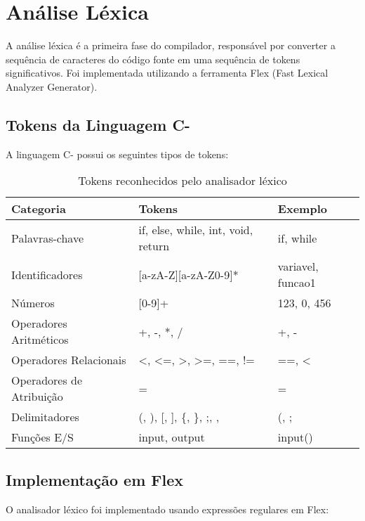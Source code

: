 \documentclass[
	12pt,				%
	oneside,
	a4paper,			%
	english,			%
	french,				%
	spanish,			%
	brazil,				%
	]{abntex2}
\begin{document}
\section{Análise Léxica}

A análise léxica é a primeira fase do compilador, responsável por converter a sequência de caracteres do código fonte em uma sequência de tokens significativos. Foi implementada utilizando a ferramenta Flex (Fast Lexical Analyzer Generator).

\subsection{Tokens da Linguagem C-}

A linguagem C- possui os seguintes tipos de tokens:

\begin{table}[H]
\centering
\caption{Tokens reconhecidos pelo analisador léxico}
\begin{tabular}{|l|l|l|}
\hline
\textbf{Categoria} & \textbf{Tokens} & \textbf{Exemplo} \\
\hline
Palavras-chave & if, else, while, int, void, return & if, while \\
\hline
Identificadores & [a-zA-Z][a-zA-Z0-9]* & variavel, funcao1 \\
\hline
Números & [0-9]+ & 123, 0, 456 \\
\hline
Operadores Aritméticos & +, -, *, / & +, - \\
\hline
Operadores Relacionais & <, <=, >, >=, ==, != & ==, < \\  
\hline
Operadores de Atribuição & = & = \\
\hline
Delimitadores & (, ), [, ], \{, \}, ;, , & (, ; \\
\hline
Funções E/S & input, output & input() \\
\hline
\end{tabular}
\end{table}

\subsection{Implementação em Flex}

O analisador léxico foi implementado usando expressões regulares em Flex:
\end{document}
